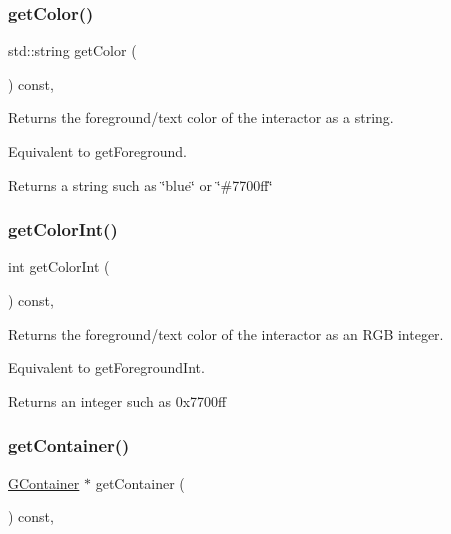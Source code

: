 \mbox{\label{classGInteractor_aa061dfa488c31e18549d64363c1d0e34}} 
\subsubsection{\texorpdfstring{get\+Color()}{getColor()}}
{\footnotesize\ttfamily std\+::string get\+Color (\begin{DoxyParamCaption}{ }\end{DoxyParamCaption}) const\hspace{0.3cm}{\ttfamily [virtual]}, {\ttfamily [inherited]}}



Returns the foreground/text color of the interactor as a string. 

Equivalent to get\+Foreground. \begin{DoxyReturn}{Returns}
a string such as \char`\"{}blue\char`\"{} or \char`\"{}\#7700ff\char`\"{} 
\end{DoxyReturn}
\mbox{\label{classGInteractor_a9635c7af766cdc3417f346683fa0e6c1}} 
\subsubsection{\texorpdfstring{get\+Color\+Int()}{getColorInt()}}
{\footnotesize\ttfamily int get\+Color\+Int (\begin{DoxyParamCaption}{ }\end{DoxyParamCaption}) const\hspace{0.3cm}{\ttfamily [virtual]}, {\ttfamily [inherited]}}



Returns the foreground/text color of the interactor as an R\+GB integer. 

Equivalent to get\+Foreground\+Int. \begin{DoxyReturn}{Returns}
an integer such as 0x7700ff 
\end{DoxyReturn}
\mbox{\label{classGInteractor_a7a6e317c29d61030929b4cd2d1c00fe7}} 
\subsubsection{\texorpdfstring{get\+Container()}{getContainer()}}
{\footnotesize\ttfamily \mbox{\hyperlink{classGContainer}{G\+Container}} $\ast$ get\+Container (\begin{DoxyParamCaption}{ }\end{DoxyParamCaption}) const\hspace{0.3cm}{\ttfamily [virtual]}, {\ttfamily [inherited]}}



